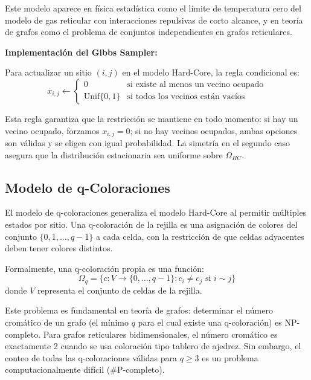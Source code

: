 Este modelo aparece en física estadística como el límite de temperatura cero del modelo de gas reticular con interacciones repulsivas de corto alcance, y en teoría de grafos como el problema de conjuntos independientes en grafos reticulares.

\textbf{Implementación del Gibbs Sampler:}

Para actualizar un sitio $(i,j)$ en el modelo Hard-Core, la regla condicional es:
\begin{equation}
x_{i,j} \leftarrow \begin{cases}
0 & \text{si existe al menos un vecino ocupado} \\
\text{Unif}\{0,1\} & \text{si todos los vecinos están vacíos}
\end{cases}
\end{equation}

Esta regla garantiza que la restricción se mantiene en todo momento: si hay un vecino ocupado, forzamos $x_{i,j} = 0$; si no hay vecinos ocupados, ambas opciones son válidas y se eligen con igual probabilidad. La simetría en el segundo caso asegura que la distribución estacionaria sea uniforme sobre $\Omega_{HC}$.

\subsection{Modelo de q-Coloraciones}

El modelo de q-coloraciones generaliza el modelo Hard-Core al permitir múltiples estados por sitio. Una q-coloración de la rejilla es una asignación de colores del conjunto $\{0, 1, \ldots, q-1\}$ a cada celda, con la restricción de que celdas adyacentes deben tener colores distintos.

Formalmente, una q-coloración propia es una función:
\begin{equation}
\Omega_q = \{c : V \to \{0, \ldots, q-1\} : c_i \neq c_j \text{ si } i \sim j\}
\end{equation}
donde $V$ representa el conjunto de celdas de la rejilla.

Este problema es fundamental en teoría de grafos: determinar el número cromático de un grafo (el mínimo $q$ para el cual existe una q-coloración) es NP-completo. Para grafos reticulares bidimensionales, el número cromático es exactamente 2 cuando se usa coloración tipo tablero de ajedrez. Sin embargo, el conteo de todas las q-coloraciones válidas para $q \geq 3$ es un problema computacionalmente difícil (\#P-completo).


